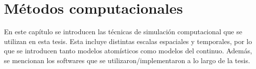 \chapter{Métodos computacionales}\label{ch:metodos}
\thispagestyle{empty}

\vspace{50pt}

\begin{adjustwidth}{50pt}{50pt}
    En este capítulo se introducen las técnicas de simulación computacional que se utilizan
    en esta tesis. Esta incluye distintas escalas espaciales y temporales, por 
    lo que se introducen tanto modelos atomísticos como modelos del continuo.
    Además, se mencionan los softwares que se utilizaron/implementaron a lo largo
    de la tesis.
\end{adjustwidth}

\clearpage
\newpage
\thispagestyle{empty}
\mbox{}
\newpage








